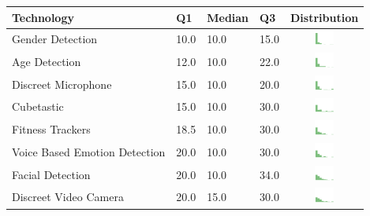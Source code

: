 
\begin{table}[t]
\begin{center}
\small
\begin{tabular}{| p{2cm} | p{1cm} | p{1cm} | p{1cm} | c |}
\hline
Technology & Q1 &  Median & Q3 & Distribution  \\ 
\hline
Gender Detection & 10.0 & 10.0 & 15.0 & \includegraphics[width = 2cm, height = 0.5cm]{tex-inputs/table-images/genderdetectionben} \\ 
Age Detection & 12.0 & 10.0 & 22.0 & \includegraphics[width = 2cm, height = 0.5cm]{tex-inputs/table-images/agedetectionben} \\ 
Discreet Microphone & 15.0 & 10.0 & 20.0 & \includegraphics[width = 2cm, height = 0.5cm]{tex-inputs/table-images/discreetmicrophoneben} \\ 
Cubetastic & 15.0 & 10.0 & 30.0 & \includegraphics[width = 2cm, height = 0.5cm]{tex-inputs/table-images/cubetasticben} \\ 
Fitness Trackers & 18.5 & 10.0 & 30.0 & \includegraphics[width = 2cm, height = 0.5cm]{tex-inputs/table-images/fitnesstrackersben} \\ 
Voice Based Emotion Detection & 20.0 & 10.0 & 30.0 & \includegraphics[width = 2cm, height = 0.5cm]{tex-inputs/table-images/voicebasedemotiondetectionben} \\ 
Facial Detection & 20.0 & 10.0 & 34.0 & \includegraphics[width = 2cm, height = 0.5cm]{tex-inputs/table-images/facialdetectionben} \\ 
Discreet Video Camera & 20.0 & 15.0 & 30.0 & \includegraphics[width = 2cm, height = 0.5cm]{tex-inputs/table-images/discreetvideocameraben} \\ 

\end{tabular}
\end{center}
\end{table}

